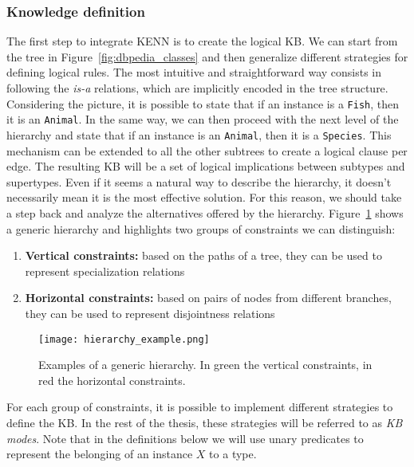 \subsubsection{Knowledge definition} \label{knowledge_generation}
The first step to integrate KENN is to create the logical KB. We can start from the tree in Figure~\ref{fig:dbpedia_classes} and then generalize different strategies for defining logical rules. The most intuitive and straightforward way consists in following the \textit{is-a} relations, which are implicitly encoded in the tree structure. Considering the picture, it is possible to state that if an instance is a \texttt{Fish}, then it is an \texttt{Animal}. In the same way, we can then proceed with the next level of the hierarchy and state that if an instance is an \texttt{Animal}, then it is a \texttt{Species}. This mechanism can be extended to all the other subtrees to create a logical clause per edge. The resulting KB will be a set of logical implications between subtypes and supertypes. Even if it seems a natural way to describe the hierarchy, it doesn't necessarily mean it is the most effective solution. For this reason, we should take a step back and analyze the alternatives offered by the hierarchy. Figure~\ref{fig:hierarchy_example} shows a generic hierarchy and highlights two groups of constraints we can distinguish:
\begin{enumerate}
    \item \textbf{Vertical constraints:} based on the paths of a tree, they can be used to represent specialization relations
    \item \textbf{Horizontal constraints:} based on pairs of nodes from different branches, they can be used to represent disjointness relations
\end{enumerate}
\begin{figure}[H]
    \centering
    \texttt{[image: hierarchy\_example.png]}
    \caption{Examples of a generic hierarchy. In green the vertical constraints, in red the horizontal constraints.}
    \label{fig:hierarchy_example}
\end{figure}
For each group of constraints, it is possible to implement different strategies to define the KB. In the rest of the thesis, these strategies will be referred to as \textit{KB modes}. Note that in the definitions below we will use unary predicates to represent the belonging of an instance $X$ to a type.

